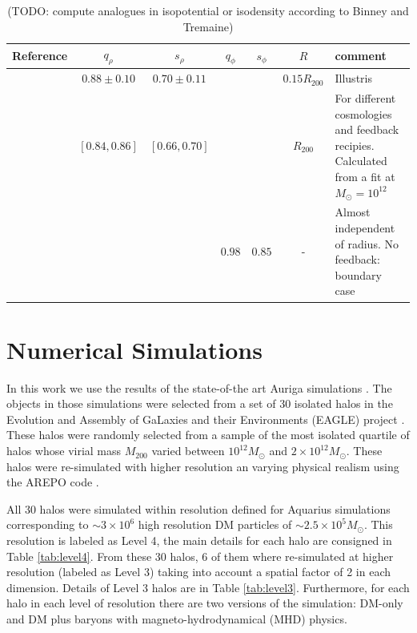 \documentclass[a4paper,fleqn,usenatbib]{mnras}
\begin{document}
\begin{table}
\begin{tabular}{|l|cc|cc|c|p{4cm}|}\hline
Reference&$q_{\rho}$&$s_{\rho}$&$q_{\phi}$&$s_{\phi}$&$R$&comment\\ \hline \hline
\citet{Chua_et_al._2018}&$\mathbf{0.88\pm0.10}$&$\mathbf{0.70\pm0.11}$&&&$0.15R_{200}$& Illustris\\\hline
%
\citet{Bryan_et_al._2013}&$\mathbf{[0.84,0.86]}$&$\mathbf{[0.66,0.70]}$&&&$R_{200}$& For different cosmologies and feedback recipies. Calculated from a fit at $M_\odot=10^12$\\\hline
%
\multirow{2}{*}{\citet{Abadi_et_al._2010}}&&&$\mathbf{0.98}$&$\mathbf{0.85}$&-& Almost independent of radius. No feedback: boundary case\\\hline
\end{tabular}
\caption{(TODO: compute analogues in isopotential or isodensity according to Binney and Tremaine)}
\end{table}




\section{Numerical Simulations}

In this work we use the results of the state-of-the art Auriga
simulations \citep{auriga}. 
The objects in those simulations were selected from a set of 30 isolated halos in
the Evolution and Assembly of GaLaxies and their Environments (EAGLE)
project \citep{Eagle}. 
These halos were randomly selected from a sample of the most isolated
quartile of halos whose virial mass $M_{200}$ varied between
$10^{12}M_\odot$ and $2\times 10^{12}M_\odot$. 
These halos were re-simulated with higher resolution an varying
physical realism using the AREPO code \citep{arepo}.
 
All 30 halos were simulated within resolution defined for Aquarius
simulations corresponding to $\sim 3\times 10^6$ high resolution DM
particles of $\sim 2.5 \times 10^5 M_\odot$.  
This resolution is labeled as Level 4, the main details for each halo
are consigned in Table \ref{tab:level4}. 
From these 30 halos, 6 of them where re-simulated at higher resolution
(labeled as Level 3) taking into account a spatial factor of 2 in each
dimension.   
Details of Level 3 halos are in Table \ref{tab:level3}. 
Furthermore, for each halo in each level of resolution there are two
versions of the simulation: DM-only and DM plus baryons with
magneto-hydrodynamical (MHD) physics.  
\end{document}
